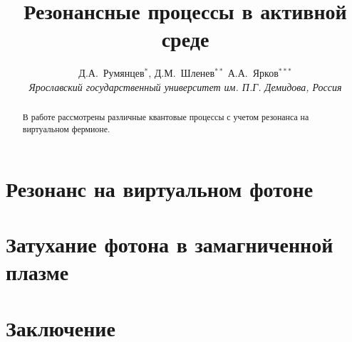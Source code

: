 \documentclass[12pt]{article}
\title{Резонансные процессы в активной среде}
\author{Д.А.~Румянцев$^{*}$, Д.М.~Шленев$^{**}$
А.А.~Ярков$^{***}$
\\
{\it Ярославский государственный университет им. П.Г. Демидова, Россия}}
\date{}
\begin{document}
\large
\maketitle
\def\abstractname{\empty}
\baselineskip=22pt

\begin{abstract}

\baselineskip=20pt

{\large В работе рассмотрены различные квантовые процессы с учетом резонанса на виртуальном фермионе.}
\end{abstract}

{\def\thefootnote{*}
\def\thefootnote{**}
\def\thefootnote{***}
}

\newpage
\unitlength 1mm




\label{Ch:WaveF}
\label{Ch:Propagator}

\label{Ch:Compton}


\section{Резонанс на виртуальном фотоне}


\section{Затухание фотона в замагниченной плазме}
\label{sec2.1}
\section{Заключение}

\newpage
%


\end{document}
